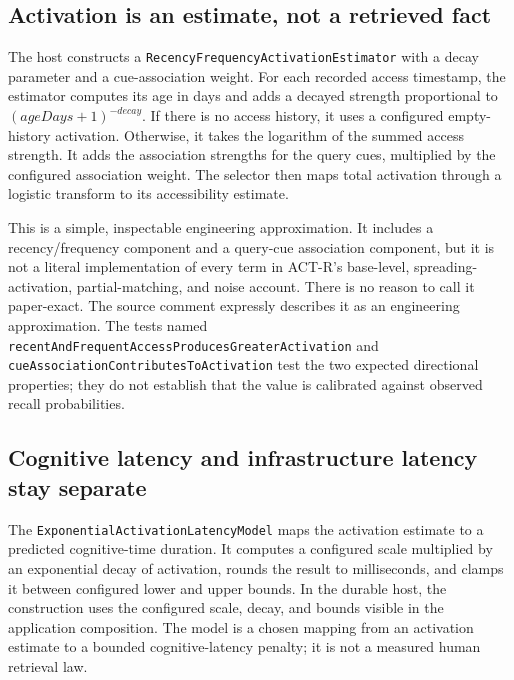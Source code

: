 \subsection{Activation is an estimate, not a retrieved fact}
\label{subsec:ch21-b1-activation}

The host constructs a \texttt{Recency\allowbreak{}Frequency\allowbreak{}Activation\allowbreak{}Estimator} with a decay parameter and a cue-association weight. For each recorded access timestamp, the estimator computes its age in days and adds a decayed strength proportional to \((ageDays+1)^{-decay}\). If there is no access history, it uses a configured empty-history activation. Otherwise, it takes the logarithm of the summed access strength. It adds the association strengths for the query cues, multiplied by the configured association weight. The selector then maps total activation through a logistic transform to its accessibility estimate.

This is a simple, inspectable engineering approximation. It includes a recency/frequency component and a query-cue association component, but it is not a literal implementation of every term in ACT-R's base-level, spreading-activation, partial-matching, and noise account. There is no reason to call it paper-exact. The source comment expressly describes it as an engineering approximation. The tests named \texttt{recent\allowbreak{}And\allowbreak{}Frequent\allowbreak{}Access\allowbreak{}Produces\allowbreak{}Greater\allowbreak{}Activation} and \texttt{cue\allowbreak{}Association\allowbreak{}Contributes\allowbreak{}To\allowbreak{}Activation} test the two expected directional properties; they do not establish that the value is calibrated against observed recall probabilities.

\subsection{Cognitive latency and infrastructure latency stay separate}
\label{subsec:ch21-b1-latency}

The \texttt{Exponential\allowbreak{}Activation\allowbreak{}Latency\allowbreak{}Model} maps the activation estimate to a predicted cognitive-time duration. It computes a configured scale multiplied by an exponential decay of activation, rounds the result to milliseconds, and clamps it between configured lower and upper bounds. In the durable host, the construction uses the configured scale, decay, and bounds visible in the application composition. The model is a chosen mapping from an activation estimate to a bounded cognitive-latency penalty; it is not a measured human retrieval law.

